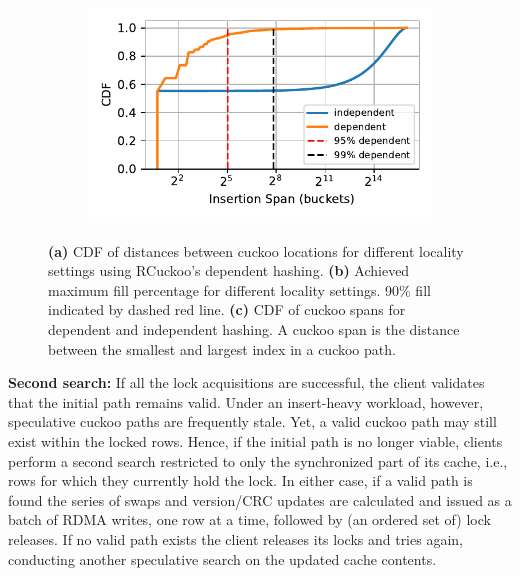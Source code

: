 \begin{figure}[t]
        \begin{subfigure}{0.3\linewidth}
        \includegraphics[width=0.99\linewidth]{fig/insertion_span.pdf}
    \end{subfigure}
    \vspace{-1em}
    \caption{
    \textbf{(a)} CDF of distances between cuckoo locations for different locality settings using RCuckoo's dependent hashing.
    \textbf{(b)} Achieved maximum fill percentage for different locality settings. 90\% fill indicated by dashed red line.
        \textbf{(c)} CDF of cuckoo spans for dependent and independent hashing. A cuckoo span is the distance between the smallest and largest index in a cuckoo path.~
    }
    \label{fig:locality-hashing}

\end{figure}


\textbf{Second search:} If all the lock acquisitions are successful,
the client validates that the initial path remains valid.  Under an
insert-heavy workload, however, speculative cuckoo paths are
frequently stale.  Yet, a valid cuckoo path may still exist within the
locked rows.  Hence, if the initial path is no longer viable, clients
perform a second search restricted to only the synchronized part of
its cache, i.e., rows for which they currently hold the lock.  In
either case, if a valid path is found the series of swaps and
version/CRC updates are calculated and issued as a batch of RDMA
writes, one row at a time, followed by (an ordered set of) lock
releases. If no valid path exists the client releases its locks and
tries again, conducting another speculative search on the updated
cache contents.

